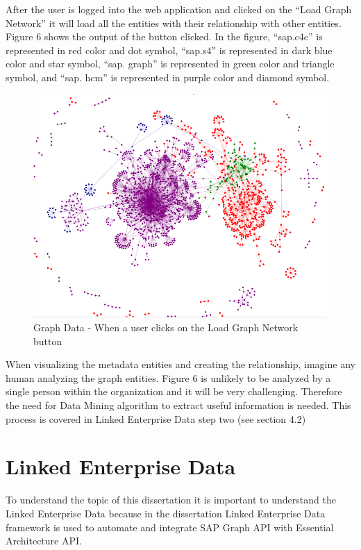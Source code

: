 \documentclass{article}
\begin{document}
After the user is logged into the web application and clicked on the “Load Graph Network” it will load all the entities with their relationship with other entities. Figure 6 shows the output of the button clicked. In the figure, “sap.c4c” is represented in red color and dot symbol, “sap.s4” is represented in dark blue color and star symbol, “sap. graph” is represented in green color and triangle symbol, and “sap. hcm” is represented in purple color and diamond symbol.

\begin{figure}[ht!]
    \centering
    \includegraphics[scale=0.5]{graph-vis}
    \caption{Graph Data - When a user clicks on the Load Graph Network button
}
    \label{fig:graph-visualization}
\end{figure}


When visualizing the metadata entities and creating the relationship, imagine any human analyzing the graph entities. Figure 6 is unlikely to be analyzed by a single person within the organization and it will be very challenging. Therefore the need for Data Mining algorithm to extract useful information is needed. This process is covered in Linked Enterprise Data step two (see section 4.2) 


\clearpage
\maketitle
\section{Linked Enterprise Data}
To understand the topic of this dissertation it is important to understand the Linked Enterprise Data because in the dissertation Linked Enterprise Data framework is used to automate and integrate SAP Graph API with Essential Architecture API.
\end{document}
